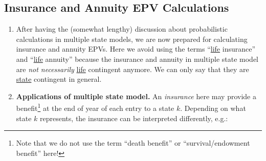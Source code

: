 \subsection{Insurance and Annuity EPV Calculations}
\label{subsect:mult-state-insur-ann-epv}
\begin{enumerate}
\item After having the (somewhat lengthy) discussion about probabilistic
calculations in multiple state models, we are now prepared for calculating
insurance and annuity EPVs. Here we avoid using the terms ``\underline{life}
insurance'' and ``\underline{life} annuity'' because the insurance and annuity
in multiple state model are \emph{not necessarily} \underline{life} contingent
anymore. We can only say that they are \underline{state} contingent in general.

\item \textbf{Applications of multiple state model.} An
\emph{insurance} here may provide a benefit\footnote{Note that we do not use
the term ``death benefit'' or ``survival/endowment benefit'' here!} at the end
of year of each entry to a state \(k\). Depending on what state \(k\)
represents, the insurance can be interpreted differently, e.g.:
\begin{center}
\end{center}


\end{enumerate}
